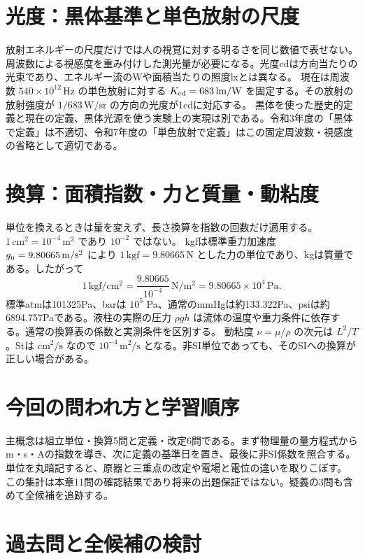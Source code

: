 \section{光度：黒体基準と単色放射の尺度}\label{theory:units:photometry}
放射エネルギーの尺度だけでは人の視覚に対する明るさを同じ数値で表せない。周波数による視感度を重み付けした測光量が必要になる。光度cdは方向当たりの光束であり、エネルギー流のWや面積当たりの照度lxとは異なる。
現在は周波数 \(540\times10^{12}\,\mathrm{Hz}\) の単色放射に対する \(K_{\rm cd}=683\,\mathrm{lm/W}\) を固定する。その放射の放射強度が \(1/683\,\mathrm{W/sr}\) の方向の光度が1cdに対応する。
黒体を使った歴史的定義と現在の定義、黒体光源を使う実験上の実現は別である。令和3年度の「黒体で定義」は不適切、令和7年度の「単色放射で定義」はこの固定周波数・視感度の省略として適切である\cite{si_brochure9}。

\section{換算：面積指数・力と質量・動粘度}\label{theory:units:conversion}
単位を換えるときは量を変えず、長さ換算を指数の回数だけ適用する。\(1\,\mathrm{cm^2}=10^{-4}\,\mathrm{m^2}\) であり \(10^{-2}\) ではない。
kgfは標準重力加速度 \(g_{\rm n}=9.80665\,\mathrm{m/s^2}\) により \(1\,\mathrm{kgf}=9.80665\,\mathrm N\) とした力の単位であり、kgは質量である。したがって
\[
 1\,\mathrm{kgf/cm^2}=\frac{9.80665}{10^{-4}}\,\mathrm{N/m^2}
 =9.80665\times10^4\,\mathrm{Pa}.
\]
標準atmは101325Pa、barは \(10^5\) Pa、通常のmmHgは約133.322Pa、psiは約6894.757Paである。液柱の実際の圧力 \(\rho g h\) は流体の温度や重力条件に依存する。通常の換算表の係数と実測条件を区別する。
動粘度 \(\nu=\mu/\rho\) の次元は \(L^2/T\)。Stは \(\mathrm{cm^2/s}\) なので \(10^{-4}\,\mathrm{m^2/s}\) となる。非SI単位であっても、そのSIへの換算が正しい場合がある\cite{si_nist811}。

\section{今回の問われ方と学習順序}
主概念は組立単位・換算5問と定義・改定6問である。まず物理量の量方程式からm・s・Aの指数を導き、次に定義の基準日を置き、最後に非SI係数を照合する。単位を丸暗記すると、原器と三重点の改定や電場と電位の違いを取りこぼす。
この集計は本章11問の確認結果であり将来の出題保証ではない。疑義の3問も含めて全候補を追跡する。

\section{過去問と全候補の検討}

